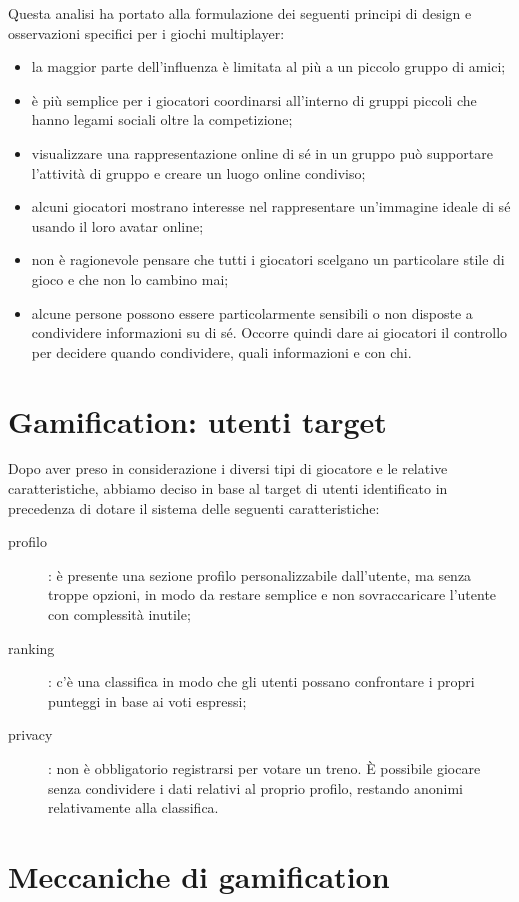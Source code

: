 Questa analisi ha portato alla formulazione dei seguenti principi di design e osservazioni specifici per i giochi multiplayer:
\begin{itemize}
    \item la maggior parte dell'influenza è limitata al più a un piccolo gruppo di amici;
    \item è più semplice per i giocatori coordinarsi all'interno di gruppi piccoli che hanno legami sociali oltre la competizione;
    \item visualizzare una rappresentazione online di sé in un gruppo può supportare l'attività di gruppo e creare un luogo online condiviso;
    \item alcuni giocatori mostrano interesse nel rappresentare un'immagine ideale di sé usando il loro avatar online;
    \item non è ragionevole pensare che tutti i giocatori scelgano un particolare stile di gioco e che non lo cambino mai;
    \item alcune persone possono essere particolarmente sensibili o non disposte a condividere informazioni su di sé. Occorre quindi dare ai giocatori il controllo per decidere quando condividere, quali informazioni e con chi.
\end{itemize}

\section{Gamification: utenti target\label{sec:gamification-utenti}}
Dopo aver preso in considerazione i diversi tipi di giocatore e le relative caratteristiche, abbiamo deciso in base al target di utenti identificato in precedenza di dotare il sistema delle seguenti caratteristiche:
\begin{description}
    \item[profilo]: è presente una sezione profilo personalizzabile dall'utente, ma senza troppe opzioni, in modo da restare semplice e non sovraccaricare l'utente con complessità inutile;
    \item[ranking]: c'è una classifica in modo che gli utenti possano confrontare i propri punteggi in base ai voti espressi;
    \item[privacy]: non è obbligatorio registrarsi per votare un treno. È possibile giocare senza condividere i dati relativi al proprio profilo, restando anonimi relativamente alla classifica.  
\end{description}


\section{Meccaniche di gamification\label{sec:gamification-meccaniche}}

